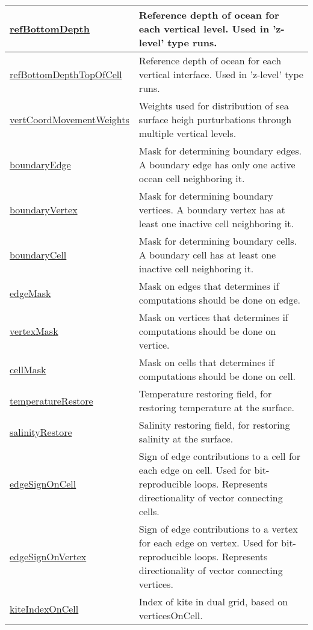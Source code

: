 {\begin{center}
\begin{longtable}{| p{2.0in} | p{4.0in} |}
	\hline
	\hyperref[subsec:var_sec_mesh_refBottomDepth]{refBottomDepth} & Reference depth of ocean for each vertical level. Used in 'z-level' type runs. \\
	\hline
	\hyperref[subsec:var_sec_mesh_refBottomDepthTopOfCell]{refBottomDepthTopOfCell} & Reference depth of ocean for each vertical interface. Used in 'z-level' type runs. \\
	\hline
	\hyperref[subsec:var_sec_mesh_vertCoordMovementWeights]{vertCoordMovementWeights} & Weights used for distribution of sea surface heigh purturbations through multiple vertical levels. \\
	\hline
	\hyperref[subsec:var_sec_mesh_boundaryEdge]{boundaryEdge} & Mask for determining boundary edges. A boundary edge has only one active ocean cell neighboring it. \\
	\hline
	\hyperref[subsec:var_sec_mesh_boundaryVertex]{boundaryVertex} & Mask for determining boundary vertices. A boundary vertex has at least one inactive cell neighboring it. \\
	\hline
	\hyperref[subsec:var_sec_mesh_boundaryCell]{boundaryCell} & Mask for determining boundary cells. A boundary cell has at least one inactive cell neighboring it. \\
	\hline
	\hyperref[subsec:var_sec_mesh_edgeMask]{edgeMask} & Mask on edges that determines if computations should be done on edge. \\
	\hline
	\hyperref[subsec:var_sec_mesh_vertexMask]{vertexMask} & Mask on vertices that determines if computations should be done on vertice. \\
	\hline
	\hyperref[subsec:var_sec_mesh_cellMask]{cellMask} & Mask on cells that determines if computations should be done on cell. \\
	\hline
	\hyperref[subsec:var_sec_mesh_temperatureRestore]{temperatureRestore} & Temperature restoring field, for restoring temperature at the surface. \\
	\hline
	\hyperref[subsec:var_sec_mesh_salinityRestore]{salinityRestore} & Salinity restoring field, for restoring salinity at the surface. \\
	\hline
	\hyperref[subsec:var_sec_mesh_edgeSignOnCell]{edgeSignOnCell} & Sign of edge contributions to a cell for each edge on cell. Used for bit-reproducible loops. Represents directionality of vector connecting cells. \\
	\hline
	\hyperref[subsec:var_sec_mesh_edgeSignOnVertex]{edgeSignOnVertex} & Sign of edge contributions to a vertex for each edge on vertex. Used for bit-reproducible loops. Represents directionality of vector connecting vertices. \\
	\hline
	\hyperref[subsec:var_sec_mesh_kiteIndexOnCell]{kiteIndexOnCell} & Index of kite in dual grid, based on verticesOnCell. \\
	\hline
\end{longtable}
\end{center}
}
